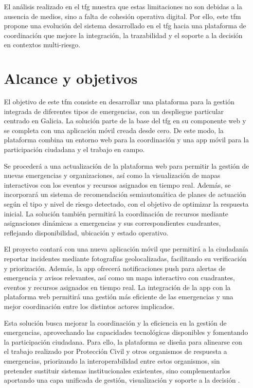 El análisis realizado en el \acrshort{tfg} muestra que estas limitaciones no son debidas a la ausencia de medios, sino a falta de cohesión operativa digital. Por ello, este \acrshort{tfm} propone una evolución del sistema desarrollado en el \acrshort{tfg} hacia una plataforma de coordinación que mejore la integración, la trazabilidad y el soporte a la decisión en contextos multi-riesgo.

\section{Alcance y objetivos}
\label{sec:objetivos}

El objetivo de este \acrshort{tfm} consiste en desarrollar una plataforma para la gestión integrada de diferentes tipos de emergencias, con un despliegue particular centrado en Galicia. La solución parte de la base del \acrshort{tfg} en su componente web y se completa con una aplicación móvil creada desde cero. De este modo, la plataforma combina un entorno web para la coordinación y una app móvil para la participación ciudadana y el trabajo en campo.

Se procederá a una actualización de la plataforma web para permitir la gestión de nuevas emergencias y organizaciones, así como la visualización de mapas interactivos con los eventos y recursos asignados en tiempo real. Además, se incorporará un sistema de recomendación semiautomática de planes de actuación según el tipo y nivel de riesgo detectado, con el objetivo de optimizar la respuesta inicial. La solución también permitirá la coordinación de recursos mediante asignaciones dinámicas a emergencias y sus correspondientes cuadrantes, reflejando disponibilidad, ubicación y estado operativo. 

El proyecto contará con una nueva aplicación móvil que permitirá a la ciudadanía reportar incidentes mediante fotografías geolocalizadas, facilitando su verificación y priorización. Además, la app ofrecerá notificaciones push para alertas de emergencia y avisos relevantes, así como un mapa interactivo con cuadrantes, eventos y recursos asignados en tiempo real. La integración de la app con la plataforma web permitirá una gestión más eficiente de las emergencias y una mejor coordinación entre los distintos actores implicados.

Esta solución busca mejorar la coordinación y la eficiencia en la gestión de emergencias, aprovechando las capacidades tecnológicas disponibles y fomentando la participación ciudadana. Para ello, la plataforma se diseña para alinearse con el trabajo realizado por Protección Civil y otros organismos de respuesta a emergencias, priorizando la interoperabilidad entre estos organismos, sin pretender sustituir sistemas institucionales existentes, sino complementarlos aportando una capa unificada de gestión, visualización y soporte a la decisión \cite{LeySNPC17_2015,NormaBasicaPC2023}. 


